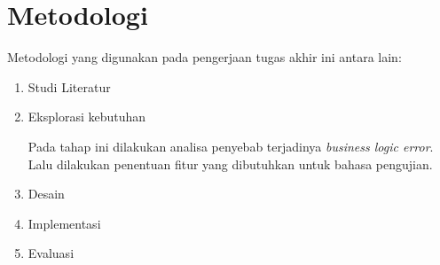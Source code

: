\section{Metodologi}

Metodologi yang digunakan pada pengerjaan tugas akhir ini antara lain:

\begin{enumerate}
    \item Studi Literatur

    \item Eksplorasi kebutuhan

    Pada tahap ini dilakukan analisa penyebab terjadinya \emph{business logic error}.
    Lalu dilakukan penentuan fitur yang dibutuhkan untuk bahasa pengujian.

    \item Desain 
    \item Implementasi 
    \item Evaluasi
\end{enumerate}
